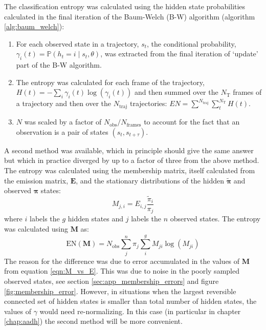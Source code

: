 The classification entropy was calculated using the hidden state probabilities calculated in the final iteration of the Baum-Welch (B-W) algorithm (algorithm \ref{alg:baum_welch}): 
\begin{enumerate}
    \item For each observed state in a trajectory, $s_t$, the conditional probability, $\gamma_{i}(t)=\mathbb{P}\left(h_{t}=i \mid s_t, \theta\right)$, was extracted from the final iteration of `update' part of the B-W algorithm. 
    \item The entropy was calculated for each frame of the trajectory,  $H(t)=-\sum_{i}\gamma_{i}(t)\log{\left(\gamma_{i}(t)\right)}$ and then summed over the $N_{\mathrm{T}}$ frames of a trajectory and then over the $N_{\mathrm{traj}}$ trajectories: $EN = \sum^{N_{\mathrm{traj}}} \sum_{t}^{N_{\mathrm{T}}} H(t)$.
    \item $N$ was scaled by a factor of $N_{\mathrm{obs}}/N_{\mathrm{frames}}$ to account for the fact that an observation is a pair of states $(s_{t}, s_{t+\tau})$.
\end{enumerate}
A second method was available, which in principle should give the same answer but which in practice diverged by up to a factor of three from the above method. The entropy was calculated using the membership matrix, itself calculated from the emission matrix, $\mathbf{E}$, and the stationary distributions of the hidden $\widetilde{\bm{\pi}}$ and observed $\bm{\pi}$ states: 
\begin{equation}\label{eqn:M_vs_E}
    M_{j,i} = E_{i,j}\frac{\widetilde{\pi}_{i}}{\pi_{j}}
\end{equation}
where $i$ labels the $g$ hidden states and $j$ labels the $n$ observed states. The entropy was calculated using $\mathbf{M}$ as: 
\begin{equation}\label{eqn:ent_v2}
    \mathrm{EN}(\mathbf{M}) = N_{\mathrm{obs}}\sum^{n}_{j}\pi_{j}\sum^{g}_{i} M_{ji}\log{\left(M_{ji}\right)}
\end{equation}
The reason for the difference was due to error accumulated in the values of  $\mathbf{M}$ from equation \ref{eqn:M_vs_E}. This was due to noise in the poorly sampled observed states, see section \ref{sec:app_membership_errors} and figure \ref{fig:membership_error}. However, in situations when the largest reversible connected set of hidden states is smaller than total number of hidden states, the values of $\gamma$ would need re-normalizing. In this case (in particular in chapter \ref{chap:aadh}) the second method will be more convenient. 

